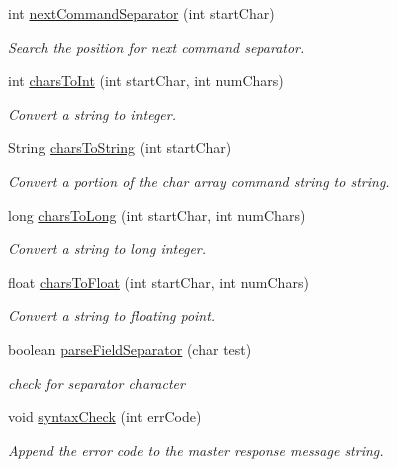 \begin{DoxyCompactItemize}
int \hyperlink{_meditech___chip_kit_control_panel_8pde_a4b62bbf3dd6cf7eb7fee557932fd1b7c}{next\-Command\-Separator} (int start\-Char)
\begin{DoxyCompactList}\small\item\em Search the position for next command separator. \end{DoxyCompactList}\item 
int \hyperlink{_meditech___chip_kit_control_panel_8pde_ad893e606e19944faa6540bba9387370f}{chars\-To\-Int} (int start\-Char, int num\-Chars)
\begin{DoxyCompactList}\small\item\em Convert a string to integer. \end{DoxyCompactList}\item 
String \hyperlink{_meditech___chip_kit_control_panel_8pde_af256eb98be4447dd754239d6c5cf4792}{chars\-To\-String} (int start\-Char)
\begin{DoxyCompactList}\small\item\em Convert a portion of the char array command string to string. \end{DoxyCompactList}\item 
long \hyperlink{_meditech___chip_kit_control_panel_8pde_ac6fe1eb1fb2d6c60ea6e06cacfa0fda7}{chars\-To\-Long} (int start\-Char, int num\-Chars)
\begin{DoxyCompactList}\small\item\em Convert a string to long integer. \end{DoxyCompactList}\item 
float \hyperlink{_meditech___chip_kit_control_panel_8pde_ab87a8658559acd359f0eeec0e64a5af6}{chars\-To\-Float} (int start\-Char, int num\-Chars)
\begin{DoxyCompactList}\small\item\em Convert a string to floating point. \end{DoxyCompactList}\item 
boolean \hyperlink{_meditech___chip_kit_control_panel_8pde_a8d202e0dacdbaec9d0b5ce185c4aeefb}{parse\-Field\-Separator} (char test)
\begin{DoxyCompactList}\small\item\em check for separator character \end{DoxyCompactList}\item 
void \hyperlink{_meditech___chip_kit_control_panel_8pde_a586164a6eff90eab6ba87a6ca123770d}{syntax\-Check} (int err\-Code)
\begin{DoxyCompactList}\small\item\em Append the error code to the master response message string. \end{DoxyCompactList}\item 

\end{DoxyCompactItemize}
